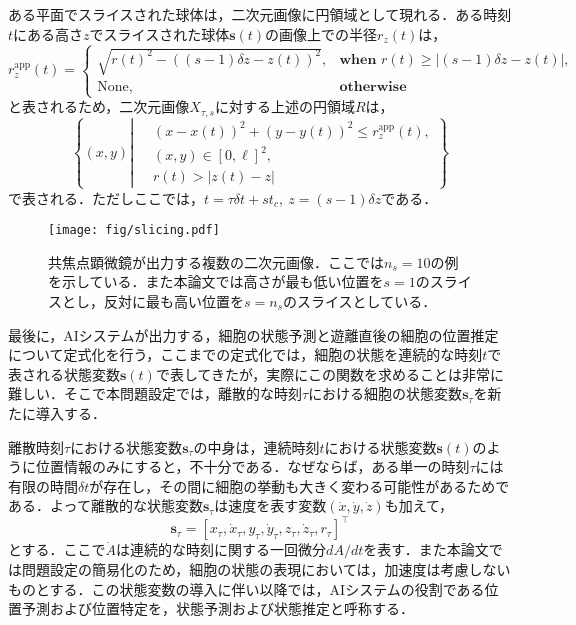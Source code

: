 ある平面でスライスされた球体は，二次元画像に円領域として現れる．ある時刻$t$にある高さ$z$でスライスされた球体$\bm{s}(t)$の画像上での半径$r_{z}(t)$は，
\begin{equation}
    \label{eq:appearant_radius}
    r_{z}^{\text{app}}(t) = 
    \begin{cases}
        \sqrt{r(t)^2 - \left((s - 1)\delta z - z(t)\right)^2}, & \textbf{when } r(t) \geq \left|(s - 1)\delta z - z(t)\right|,
        \\ \text{None}, & \textbf{otherwise}
    \end{cases}
\end{equation}
と表されるため，二次元画像$X_{\tau, s}$に対する上述の円領域$R$は，
\begin{equation}
    \label{eq:circle_region}
    \left\{ (x, y) \left| ~ 
        \begin{aligned}
            &(x - x(t))^2 + (y - y(t))^2 \leq r_z^{\text{app}}(t),
            \\ & (x, y) \in [0, \ell]^2,
            \\ & r(t) > \left|z(t) - z\right|
        \end{aligned}
    \right.
    \right\}
\end{equation}
で表される．ただしここでは，$t = \tau \delta t + s t_c, ~ z = (s -1 ) \delta z$である．

\begin{figure}[t]
    \centering
    \texttt{[image: fig/slicing.pdf]}
    \caption[共焦点顕微鏡が出力する複数の二次元画像]{共焦点顕微鏡が出力する複数の二次元画像．ここでは$n_s=10$の例を示している．また本論文では高さが最も低い位置を$s=1$のスライスとし，反対に最も高い位置を$s=n_s$のスライスとしている．}
    \label{fig:sliced_image}
\end{figure}

最後に，AIシステムが出力する，細胞の状態予測と遊離直後の細胞の位置推定について定式化を行う，ここまでの定式化では，細胞の状態を連続的な時刻$t$で表される状態変数$\bm{s}(t)$で表してきたが，実際にこの関数を求めることは非常に難しい．そこで本問題設定では，離散的な時刻$\tau$における細胞の状態変数$\bm{s}_{\tau}$を新たに導入する．

離散時刻$\tau$における状態変数$\bm{s}_{\tau}$の中身は，連続時刻$t$における状態変数$\bm{s}(t)$のように位置情報のみにすると，不十分である．なぜならば，ある単一の時刻$\tau$には有限の時間$\delta t$が存在し，その間に細胞の挙動も大きく変わる可能性があるためである．よって離散的な状態変数$\bm{s}_{\tau}$は速度を表す変数$(\dot{x}, \dot{y}, \dot{z})$も加えて，
\begin{equation}
    \label{eq:discreted_state_vector}
    \bm{s}_{\tau} = \left[x_{\tau}, \dot{x}_{\tau}, y_{\tau}, \dot{y}_{\tau}, z_{\tau}, \dot{z}_{\tau}, r_{\tau}\right]^{\top}
\end{equation}
とする．ここで$\dot{A}$は連続的な時刻に関する一回微分$dA/dt$を表す．また本論文では問題設定の簡易化のため，細胞の状態の表現においては，加速度は考慮しないものとする．この状態変数の導入に伴い以降では，AIシステムの役割である位置予測および位置特定を，状態予測および状態推定と呼称する．

